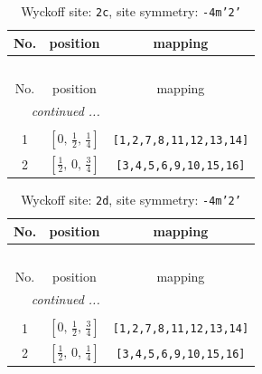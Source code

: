 \documentclass[fleqn,8pt]{jsarticle}
\begin{document}
\renewcommand{\arraystretch}{1.2}
\begin{longtable}{ccc}
\caption{Wyckoff site: {\tt 2c}, site symmetry: {\tt -4m'2'}}
 \\
 \hline \hline
No. & position & mapping \\ \hline \endfirsthead

\multicolumn{2}{l}{\tablename\ \thetable{}} \\
 \hline \hline
No. & position & mapping \\ \hline \endhead

 \hline \hline
\multicolumn{2}{r}{\footnotesize\it continued ...} \\ \endfoot

 \hline \hline
\multicolumn{2}{r}{} \\ \endlastfoot

1 & $\left[ 0,\, \frac{1}{2},\, \frac{1}{4} \right]$ & {\tt [1,2,7,8,11,12,13,14]} \\ \hline
2 & $\left[ \frac{1}{2},\, 0,\, \frac{3}{4} \right]$ & {\tt [3,4,5,6,9,10,15,16]} \\
\end{longtable}
\renewcommand{\arraystretch}{1.2}
\begin{longtable}{ccc}
\caption{Wyckoff site: {\tt 2d}, site symmetry: {\tt -4m'2'}}
 \\
 \hline \hline
No. & position & mapping \\ \hline \endfirsthead

\multicolumn{2}{l}{\tablename\ \thetable{}} \\
 \hline \hline
No. & position & mapping \\ \hline \endhead

 \hline \hline
\multicolumn{2}{r}{\footnotesize\it continued ...} \\ \endfoot

 \hline \hline
\multicolumn{2}{r}{} \\ \endlastfoot

1 & $\left[ 0,\, \frac{1}{2},\, \frac{3}{4} \right]$ & {\tt [1,2,7,8,11,12,13,14]} \\ \hline
2 & $\left[ \frac{1}{2},\, 0,\, \frac{1}{4} \right]$ & {\tt [3,4,5,6,9,10,15,16]} \\
\end{longtable}
\renewcommand{\arraystretch}{1.2}
\end{document}
